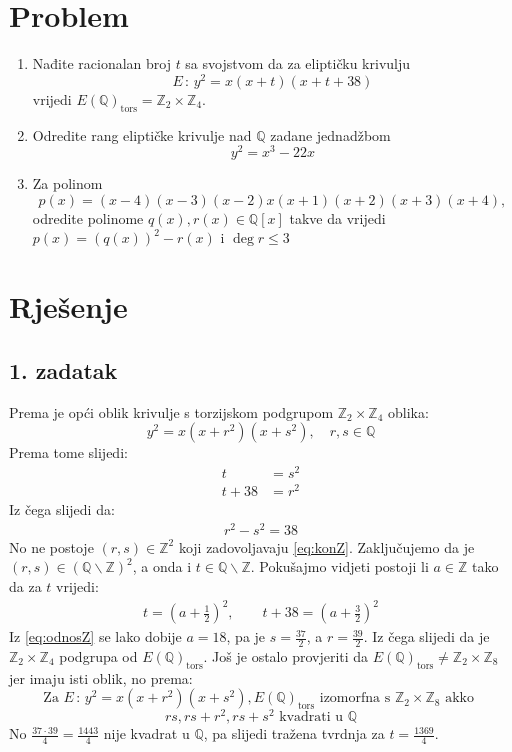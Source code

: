 \documentclass[12pt, a4paper]{article}
\begin{document}
\begin{spacing}{1.5}
\section{Problem}
\begin{enumerate}
\item Nađite racionalan broj $t$ sa svojstvom da za eliptičku krivulju 
\[E \, : \, y^2 =x(x+t)(x+t+38)\]
vrijedi $E(\mathbb{Q})_{\textrm{tors}}=\mathbb{Z}_2 \times \mathbb{Z}_4$.
\item Odredite rang eliptičke krivulje nad $\mathbb{Q}$ zadane jednadžbom
\[y^2=x^3-22x\]
\item Za polinom
\[p(x) = (x - 4)(x - 3)(x - 2)x(x + 1)(x + 2)(x + 3)(x + 4),\]
odredite polinome $q(x), r(x) \in \mathbb{Q}[x]$ takve da vrijedi $p(x)=(q(x))^2-r(x)$ i $\deg r \leq 3$
\end{enumerate}
\newpage
\section{Rješenje}
\subsection{1. zadatak}
Prema \cite[p.~28]{ekk} je opći oblik krivulje s torzijskom podgrupom $\mathbb{Z}_2 \times \mathbb{Z}_4$ oblika:
\begin{equation}
\label{eq:opciOblik}	
y^2=x(x+r^2)(x+s^2), \quad r,s \in \mathbb{Q}
\end{equation}
Prema tome slijedi:
\begin{align}
\label{eq:jdba1}
t &= s^2 \\
t+38 &= r^2
\end{align}
Iz čega slijedi da:
\begin{align}
\label{eq:konZ}
r^2-s^2=38
\end{align}
No ne postoje $(r,s) \in \mathbb{Z}^2$ koji zadovoljavaju \eqref{eq:konZ}. Zaključujemo da je $(r,s) \in (\mathbb{Q}\backslash \mathbb{Z})^2$, a onda i $t \in \mathbb{Q}\backslash\mathbb{Z}$.
Pokušajmo vidjeti postoji li $a \in \mathbb{Z}$ tako da za $t$ vrijedi:
\begin{align}
	\label{eq:odnosZ}
	t=\left(a+\frac{1}{2}\right)^2, \qquad	t+38=\left(a+\frac{3}{2}\right)^2
\end{align}
Iz \eqref{eq:odnosZ} se lako dobije $a=18$, pa je $s=\frac{37}{2}$, a $r=\frac{39}{2}$. Iz čega slijedi da je $\mathbb{Z}_2 \times \mathbb{Z}_4$ podgrupa od  $E(\mathbb{Q})_{\textrm{tors}}$. Još je ostalo provjeriti da $E(\mathbb{Q})_{\textrm{tors}} \neq \mathbb{Z}_2 \times \mathbb{Z}_8$ jer imaju isti oblik, no prema:
\[\textrm{Za } E \, : \, y^2=x(x+r^2)(x+s^2), E(\mathbb{Q})_{\textrm{tors}} \textrm{ izomorfna s } \mathbb{Z}_2 \times \mathbb{Z}_8 \textrm{ akko } \] 
\[rs, rs+r^2, rs+s^2 \textrm{ kvadrati u }\mathbb{Q} \]
No $\frac{37\cdot 39}{4}=\frac{1443}{4}$ nije kvadrat u $\mathbb{Q}$, pa slijedi tražena tvrdnja za $t=\frac{1369}{4}$.

\end{spacing}
\newpage
\nocite{*}


\end{document}
